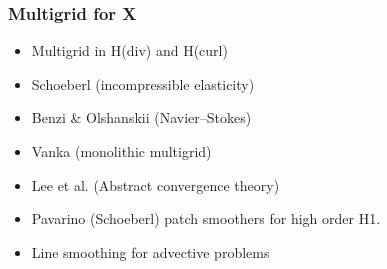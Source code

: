 \documentclass[presentation,aspectratio=43,10pt]{beamer}
\begin{document}
\begin{frame}
  \frametitle{Multigrid for X}
  \begin{itemize}
  \item Multigrid in H(div) and H(curl) \parencite{Arnold:2000}
  \item Schoeberl (incompressible elasticity) \parencite{Schoeberl:1999}
  \item Benzi \& Olshanskii (Navier--Stokes) \parencite{Benzi:2006}
  \item Vanka (monolithic multigrid)
  \item Lee et al. (Abstract convergence theory) \parencite{Lee:2007}
  \item Pavarino (Schoeberl) patch smoothers for high order H1. \parencite{Pavarino:1993}
  \item Line smoothing for advective problems 
  \end{itemize}
\end{frame}
\end{document}

